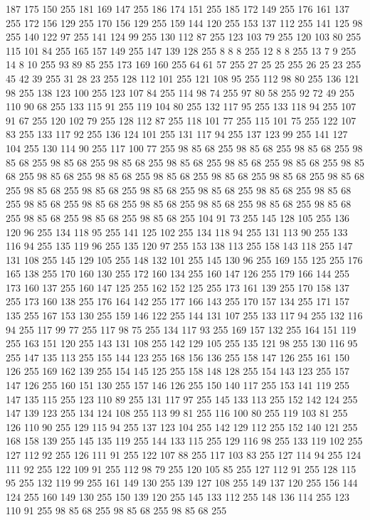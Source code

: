 187 175 150 255 181 169 147 255 186 174 151 255 185 172 149 255 176 161 137 255 172 156 129 255 170 156 129 255 159 144 120 255 153 137 112 255 141 125 98 255 140 122 97 255 141 124 99 255 130 112 87 255 123 103 79 255 120 103 80 255 115 101 84 255 165 157 149 255 147 139 128 255 8 8 8 255 12 8 8 255 13 7 9 255 14 8 10 255 93 89 85 255 173 169 160 255 64 61 57 255 27 25 25 255 26 25 23 255 45 42 39 255 31 28 23 255 128 112 101 255 121 108 95 255 112 98 80 255 136 121 98 255 138 123 100 255 123 107 84 255 114 98 74 255 97 80 58 255 92 72 49 255 110 90 68 255 133 115 91 255 119 104 80 255 132 117 95 255 133 118 94 255 107 91 67 255 120 102 79 255 128 112 87 255 118 101 77 255 115 101 75 255 122 107 83 255 133 117 92 255 136 124 101 255 131 117 94 255 137 123 99 255 141 127 104 255 130 114 90 255 117 100 77 255 98 85 68 255 98 85 68 255 98 85 68 255 98 85 68 255 98 85 68 255 98 85 68 255 98 85 68 255 98 85 68 255
98 85 68 255 98 85 68 255 98 85 68 255 98 85 68 255 98 85 68 255 98 85 68 255 98 85 68 255 98 85 68 255 98 85 68 255 98 85 68 255 98 85 68 255 98 85 68 255 98 85 68 255 98 85 68 255 98 85 68 255 98 85 68 255 98 85 68 255 98 85 68 255 98 85 68 255 98 85 68 255 98 85 68 255 98 85 68 255 98 85 68 255 104 91 73 255 145 128 105 255 136 120 96 255 134 118 95 255 141 125 102 255 134 118 94 255 131 113 90 255 133 116 94 255 135 119 96 255 135 120 97 255 153 138 113 255 158 143 118 255 147 131 108 255 145 129 105 255 148 132 101 255 145 130 96 255 169 155 125 255 176 165 138 255 170 160 130 255 172 160 134 255 160 147 126 255 179 166 144 255 173 160 137 255 160 147 125 255 162 152 125 255 173 161 139 255 170 158 137 255 173 160 138 255 176 164 142 255 177 166 143 255 170 157 134 255 171 157 135 255 167 153 130 255 159 146 122 255 144 131 107 255 133 117 94 255 132 116 94 255 117 99 77 255 117 98 75 255 134 117 93 255 169 157 132 255
164 151 119 255 163 151 120 255 143 131 108 255 142 129 105 255 135 121 98 255 130 116 95 255 147 135 113 255 155 144 123 255 168 156 136 255 158 147 126 255 161 150 126 255 169 162 139 255 154 145 125 255 158 148 128 255 154 143 123 255 157 147 126 255 160 151 130 255 157 146 126 255 150 140 117 255 153 141 119 255 147 135 115 255 123 110 89 255 131 117 97 255 145 133 113 255 152 142 124 255 147 139 123 255 134 124 108 255 113 99 81 255 116 100 80 255 119 103 81 255 126 110 90 255 129 115 94 255 137 123 104 255 142 129 112 255 152 140 121 255 168 158 139 255 145 135 119 255 144 133 115 255 129 116 98 255 133 119 102 255 127 112 92 255 126 111 91 255 122 107 88 255 117 103 83 255 127 114 94 255 124 111 92 255 122 109 91 255 112 98 79 255 120 105 85 255 127 112 91 255 128 115 95 255 132 119 99 255 161 149 130 255 139 127 108 255 149 137 120 255 156 144 124 255 160 149 130 255 150 139 120 255 145 133 112 255 148 136 114 255 123 110 91 255 98 85 68 255 98 85 68 255 98 85 68 255
